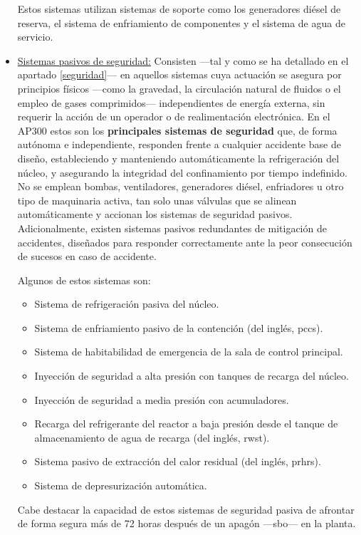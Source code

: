 \begin{itemize}
Estos sistemas utilizan sistemas de soporte como los generadores diésel de reserva, el sistema de enfriamiento de componentes y el sistema de agua de servicio. 
  
  \item \underline{Sistemas pasivos de seguridad:} Consisten ---tal y como se ha detallado en el apartado \ref{seguridad}--- en aquellos sistemas cuya actuación se asegura por principios físicos ---como la gravedad, la circulación natural de fluidos o el empleo de gases comprimidos--- independientes de energía externa, sin requerir la acción de un operador o de realimentación electrónica.
  En el AP300 estos son los \textbf{principales sistemas de seguridad} que, de forma autónoma e independiente, responden frente a cualquier accidente base de diseño, estableciendo y manteniendo automáticamente la refrigeración del núcleo, y asegurando la integridad del confinamiento por tiempo indefinido. No se emplean bombas, ventiladores, generadores diésel, enfriadores u otro tipo de maquinaria activa, tan solo unas válvulas que se alinean automáticamente y accionan los sistemas de seguridad pasivos.
  Adicionalmente, existen sistemas pasivos redundantes de mitigación de accidentes, diseñados para responder correctamente ante la peor consecución de sucesos en caso de accidente.
  
  Algunos de estos sistemas son:
  \begin{itemize}
    \item Sistema de refrigeración pasiva del núcleo.
    \item Sistema de enfriamiento pasivo de la contención (del inglés, \acrshort{pccs}).
    \item Sistema de habitabilidad de emergencia de la sala de control principal.
    \item Inyección de seguridad a alta presión con tanques de recarga del núcleo.
    \item Inyección de seguridad a media presión con acumuladores.
    \item Recarga del refrigerante del reactor a baja presión desde el tanque de almacenamiento de agua de recarga (del inglés, \acrshort{rwst}).
    \item Sistema pasivo de extracción del calor residual (del inglés, \acrshort{prhrs}).
    \item Sistema de depresurización automática.
  \end{itemize}
  
  Cabe destacar la capacidad de estos sistemas de seguridad pasiva de afrontar de forma segura más de 72 horas después de un apagón ---\acrfull{sbo}--- en la planta.


\end{itemize}
